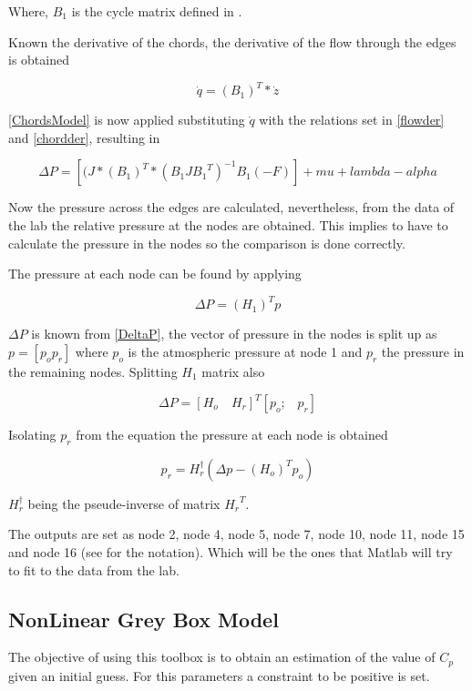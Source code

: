 Where, $B_1$ is the cycle matrix defined in . 

Known the derivative of the chords, the derivative of the flow through the edges is obtained

\begin{equation}
  \dot{q}  = (B_1)^T * \dot{z}
  \label{flowder}
\end{equation}

\eqref{ChordsModel} is now applied substituting $\dot{q}$ with the relations set in \eqref{flowder} and \eqref{chordder}, resulting in

\begin{equation}
  \Delta P = [(J*(B_1)^T * (B_1 J {B_1}^T)^{-1}B_1 (-F)]+mu+lambda-alpha
  \label{DeltaP}
\end{equation}

Now the pressure across the edges are calculated, nevertheless, from the data of the lab the relative pressure at the nodes are obtained. This implies to 
have to calculate the pressure in the nodes so the comparison is done correctly. 

The pressure at each node can be found by applying 

\begin{equation}
  \Delta P = (H_1)^T p
\end{equation}

$\Delta P$ is known from \eqref{DeltaP}, the vector of pressure in the nodes is split up as $p = [p_o p_r]$ where $p_o$ is the atmospheric pressure at 
node 1 and $p_r$ the pressure in the remaining nodes. Splitting $H_1$ matrix also

\begin{equation}
  \Delta P = [H_o \quad H_r]^T [p_o \text{;} \quad p_r]
\end{equation}

Isolating $p_r$ from the equation the pressure at each node is obtained

\begin{equation}
  p_r = H_r^{\dagger} (\Delta p - (H_o)^{T} p_o)
\end{equation}

$H_r^{\dagger}$ being the pseude-inverse of matrix ${H_r}^{T}$.

The outputs are set as node 2, node 4, node 5, node 7, node 10, node 11, node 15 and node 16 (see  for the notation). Which will be the ones that Matlab will try to fit 
to the data from the lab. 

\subsection{NonLinear Grey Box Model}
The objective of using this toolbox is to obtain an estimation of the value of $C_p$ given an initial guess. For this parameters a constraint to be 
positive is set. 

